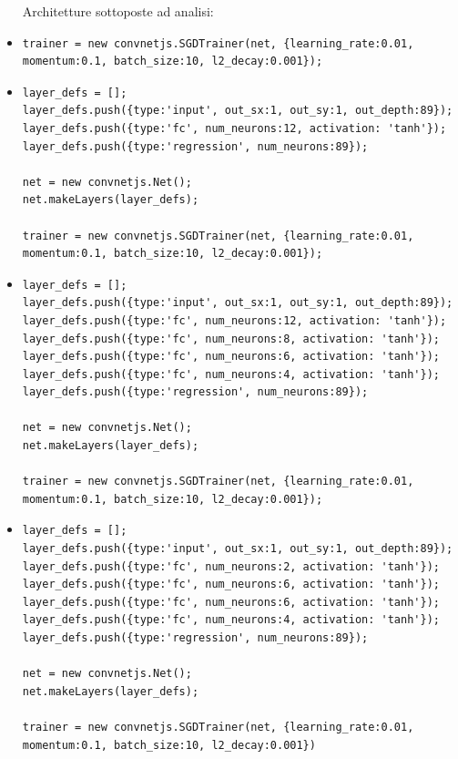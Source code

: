 \begin{itemize}
Architetture sottoposte ad analisi:
\item \begin{verbatim}
trainer = new convnetjs.SGDTrainer(net, {learning_rate:0.01,
momentum:0.1, batch_size:10, l2_decay:0.001});
\end{verbatim}

\item \begin{verbatim}
layer_defs = [];
layer_defs.push({type:'input', out_sx:1, out_sy:1, out_depth:89});
layer_defs.push({type:'fc', num_neurons:12, activation: 'tanh'});
layer_defs.push({type:'regression', num_neurons:89});

net = new convnetjs.Net();
net.makeLayers(layer_defs);

trainer = new convnetjs.SGDTrainer(net, {learning_rate:0.01,
momentum:0.1, batch_size:10, l2_decay:0.001});
\end{verbatim}

\item \begin{verbatim}
layer_defs = [];
layer_defs.push({type:'input', out_sx:1, out_sy:1, out_depth:89});
layer_defs.push({type:'fc', num_neurons:12, activation: 'tanh'});
layer_defs.push({type:'fc', num_neurons:8, activation: 'tanh'});
layer_defs.push({type:'fc', num_neurons:6, activation: 'tanh'});
layer_defs.push({type:'fc', num_neurons:4, activation: 'tanh'});
layer_defs.push({type:'regression', num_neurons:89});

net = new convnetjs.Net();
net.makeLayers(layer_defs);

trainer = new convnetjs.SGDTrainer(net, {learning_rate:0.01, 
momentum:0.1, batch_size:10, l2_decay:0.001});
\end{verbatim}



\item \begin{verbatim}
layer_defs = [];
layer_defs.push({type:'input', out_sx:1, out_sy:1, out_depth:89});
layer_defs.push({type:'fc', num_neurons:2, activation: 'tanh'});
layer_defs.push({type:'fc', num_neurons:6, activation: 'tanh'});
layer_defs.push({type:'fc', num_neurons:6, activation: 'tanh'});
layer_defs.push({type:'fc', num_neurons:4, activation: 'tanh'});
layer_defs.push({type:'regression', num_neurons:89});

net = new convnetjs.Net();
net.makeLayers(layer_defs);

trainer = new convnetjs.SGDTrainer(net, {learning_rate:0.01, 
momentum:0.1, batch_size:10, l2_decay:0.001})
\end{verbatim}




\end{itemize}
